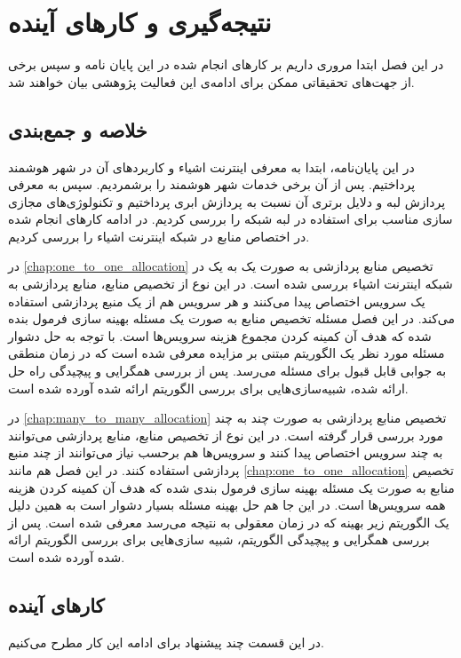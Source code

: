 \chapter{نتیجه‌گیری و کار‌های آینده}\label{chap:conclusion}
  \thispagestyle{empty}
  در این فصل ابتدا مروری داریم بر کار‌های انجام شده در این پایان نامه و سپس برخی از جهت‌های تحقیقاتی ممکن برای ادامه‌ی این فعالیت پژوهشی بیان خواهند شد.

  \section{خلاصه و جمع‌بندی}
    در این پایان‌نامه، ابتدا به معرفی اینترنت اشیاء و کاربرد‌های آن در شهر هوشمند پرداختیم.
    پس از آن برخی خدمات شهر هوشمند را برشمردیم.
    سپس به معرفی پردازش لبه و دلایل برتری آن نسبت به پردازش ابری پرداختیم و تکنولوژی‌های مجازی سازی مناسب برای استفاده در لبه شبکه را بررسی کردیم.
    در ادامه کار‌های انجام شده در اختصاص منابع در شبکه اینترنت اشیاء را بررسی کردیم.

    در \cref{chap:one_to_one_allocation} تخصیص منابع پردازشی به صورت یک به یک در شبکه اینترنت اشیاء بررسی شده است.
    در این نوع از تخصیص منابع، منابع پردازشی به یک سرویس اختصاص پیدا می‌کنند و هر سرویس هم از یک منبع پردازشی استفاده می‌کند.
    در این فصل مسئله تخصیص منابع به صورت یک مسئله بهینه سازی فرمول بنده شده که هدف آن کمینه کردن مجموع هزینه سرویس‌ها است.
    با توجه به حل دشوار مسئله مورد نظر یک الگوریتم مبتنی بر مزایده معرفی شده است که در زمان منطقی به جوابی قابل قبول برای مسئله می‌رسد.
    پس از بررسی همگرایی و پیچیدگی راه حل ارائه شده، شبیه‌سازی‌هایی برای بررسی الگوریتم ارائه شده آورده شده است.

    در \cref{chap:many_to_many_allocation} تخصیص منابع پردازشی به صورت چند به چند مورد بررسی قرار گرفته است.
    در این نوع از تخصیص منابع، منابع پردازشی می‌توانند به چند سرویس اختصاص پیدا کنند و سرویس‌ها هم برحسب نیاز می‌توانند از چند منبع پردازشی استفاده کنند.
    در این فصل هم مانند \cref{chap:one_to_one_allocation} تخصیص منابع به صورت یک مسئله بهینه سازی فرمول بندی شده که هدف آن کمینه کردن هزینه همه سرویس‌ها است.
    در این جا هم حل بهینه مسئله بسیار دشوار است به همین دلیل یک الگوریتم زیر بهینه که در زمان معقولی به نتیجه می‌رسد معرفی شده است.
    پس از بررسی همگرایی و پیچیدگی الگوریتم، شبیه سازی‌هایی برای بررسی الگوریتم ارائه شده آورده شده است.

  \section{کار‌های آینده}
    در این قسمت چند پیشنهاد برای ادامه این کار مطرح می‌کنیم.
  
